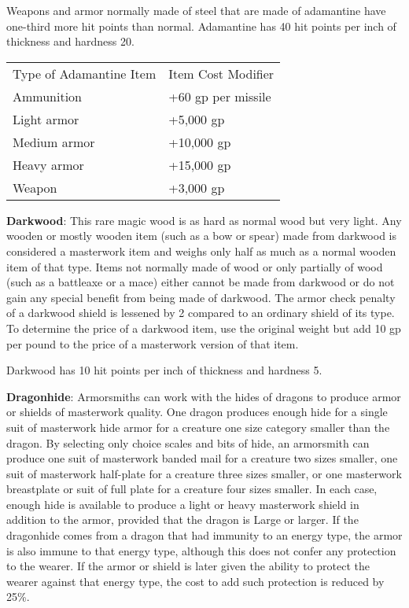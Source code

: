 Weapons and armor normally made of steel that are made of adamantine have one-third more hit points than normal. Adamantine has 40 hit points per inch of thickness and hardness 20.
			
\begin{table}
\sffamily
 \begin{tabular}{ll}
Type of Adamantine Item & Item Cost Modifier\\
Ammunition & +60 gp per missile \\
Light armor & +5,000 gp\\
Medium armor & +10,000 gp\\
Heavy armor & +15,000 gp\\
Weapon & +3,000 gp\\
 \end{tabular}

\end{table}

		
\textbf{Darkwood}: This rare magic wood is as hard as normal wood but very light. Any wooden or mostly wooden item (such as a bow or spear) made from darkwood is considered a masterwork item and weighs only half as much as a normal wooden item of that type. Items not normally made of wood or only partially of wood (such as a battleaxe or a mace) either cannot be made from darkwood or do not gain any special benefit from being made of darkwood. The armor check penalty of a darkwood shield is lessened by 2 compared to an ordinary shield of its type. To determine the price of a darkwood item, use the original weight but add 10 gp per pound to the price of a masterwork version of that item.
	
Darkwood has 10 hit points per inch of thickness and hardness 5.
	
\textbf{Dragonhide}: Armorsmiths can work with the hides of dragons to produce armor or shields of masterwork quality. One dragon produces enough hide for a single suit of masterwork hide armor for a creature one size category smaller than the dragon. By selecting only choice scales and bits of hide, an armorsmith can produce one suit of masterwork banded mail for a creature two sizes smaller, one suit of masterwork half-plate for a creature three sizes smaller, or one masterwork breastplate or suit of full plate for a creature four sizes smaller. In each case, enough hide is available to produce a light or heavy masterwork shield in addition to the armor, provided that the dragon is Large or larger. If the dragonhide comes from a dragon that had immunity to an energy type, the armor is also immune to that energy type, although this does not confer any protection to the wearer. If the armor or shield is later given the ability to protect the wearer against that energy type, the cost to add such protection is reduced by 25\%.
	
